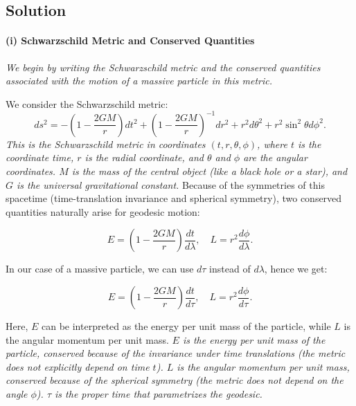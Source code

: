 \documentclass{article}
\begin{document}
\subsection*{Solution}

\paragraph{(i) Schwarzschild Metric and Conserved Quantities}
\textit{We begin by writing the Schwarzschild metric and the conserved quantities associated with the motion of a massive particle in this metric.}

We consider the Schwarzschild metric:
\begin{equation*}
ds^2 = - \left(1 - \frac{2GM}{r}\right)dt^2 + \left(1 - \frac{2GM}{r}\right)^{-1}dr^2 + r^2 d\theta^2 + r^2 \sin^2\theta d\phi^2.
\end{equation*}
\textit{This is the Schwarzschild metric in coordinates \((t, r, \theta, \phi)\), where \(t\) is the coordinate time, \(r\) is the radial coordinate, and \(\theta\) and \(\phi\) are the angular coordinates. \(M\) is the mass of the central object (like a black hole or a star), and \(G\) is the universal gravitational constant.}
Because of the symmetries of this spacetime (time-translation invariance and spherical symmetry), two conserved quantities naturally arise for geodesic motion:

\begin{equation*}
E = \left(1 - \frac{2GM}{r}\right) \frac{dt}{d\lambda},
\quad
L = r^{2} \frac{d\phi}{d\lambda}.
\end{equation*}

In our case of a massive particle, we can use $d\tau$ instead of $d\lambda$, hence we get:

\begin{equation*}
E = \left(1 - \frac{2GM}{r}\right) \frac{dt}{d\tau},
\quad
L = r^{2} \frac{d\phi}{d\tau}.
\end{equation*}

Here, \(E\) can be interpreted as the energy per unit mass of the particle, while \(L\) is the angular momentum per unit mass.
\textit{\(E\) is the energy per unit mass of the particle, conserved because of the invariance under time translations (the metric does not explicitly depend on time \(t\)). \(L\) is the angular momentum per unit mass, conserved because of the spherical symmetry (the metric does not depend on the angle \(\phi\)). \(\tau\) is the proper time that parametrizes the geodesic.}
\end{document}

